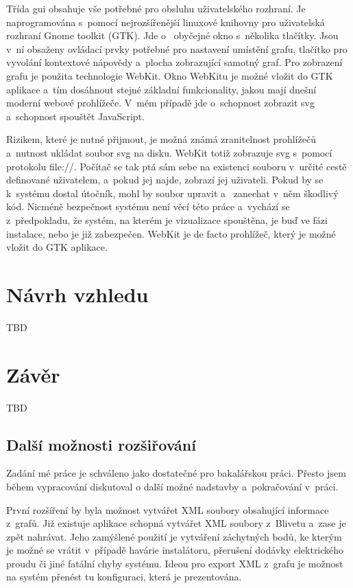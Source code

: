 \documentclass[color,table,oneside,nolot,nolof]{fithesis}
\begin{document}
	Třída gui obsahuje vše potřebné pro obsluhu uživatelského rozhraní. Je naprogramována s~pomocí nejrozšířenější linuxové knihovny pro uživatelská rozhraní Gnome toolkit (GTK). Jde o~
	obyčejné okno s~několika tlačítky. Jsou v~ní obsaženy ovládací prvky potřebné pro nastavení umístění grafu, tlačítko pro vyvolání kontextové
	nápovědy a~plocha zobrazující samotný graf. Pro zobrazení grafu je použita technologie WebKit. Okno WebKitu je možné vložit do GTK aplikace a~tím dosáhnout stejné základní funkcionality,
	jakou mají dnešní moderní webové prohlížeče. V~mém případě jde o~schopnost zobrazit svg a~schopnost spouštět JavaScript.

	Rizikem, které je nutné přijmout, je možná známá zranitelnost prohlížečů a~nutnost ukládat soubor svg na disku. WebKit totiž zobrazuje svg s~pomocí protokolu file://. Počítač se
	tak ptá sám sebe na existenci souboru v~určité cestě definované uživatelem, a~pokud jej najde, zobrazí jej uživateli. Pokud by se k~systému dostal útočník, mohl by soubor upravit a~
	zanechat v~něm škodlivý kód. Nicméně bezpečnost systému není věcí této práce a~vychází se z~předpokladu, že systém, na kterém je vizualizace spouštěna, je buď ve fázi instalace, nebo
	je již zabezpečen. WebKit je de facto prohlížeč, který je možné vložit do GTK aplikace.

\chapter{Návrh vzhledu}
TBD

\chapter{Závěr}
TBD
\section{Další možnosti rozšiřování}
	Zadání mé práce je schváleno jako dostatečné pro bakalářskou práci. Přesto jsem během vypracování diskutoval o další možné nadstavby a~pokračování v~práci.

	První rozšíření by byla možnost vytvářet XML soubory obsahující informace z~grafů. Již existuje aplikace schopná vytvářet XML soubory z~Blivetu a~zase je zpět nahrávat. Jeho zamýšlené
	použití je vytváření záchytných bodů, ke kterým je možné se vrátit v~případě havárie instalátoru, přerušení dodávky elektrického proudu či jiné fatální chyby systému. Ideou pro export
	XML z~grafu je možnost na systém přenést tu konfiguraci, která je prezentována.
\end{document}
